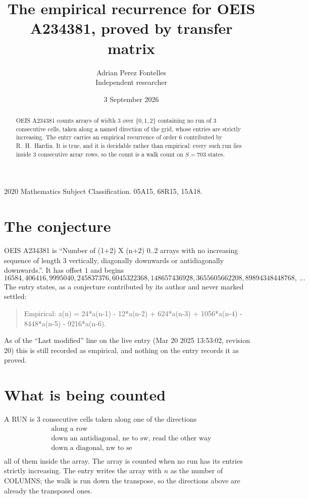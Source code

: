 \documentclass[11pt,a4paper]{article}
\title{The empirical recurrence for OEIS A234381, proved by transfer matrix}
\author{Adrian Perez Fontelles\\ \small Independent researcher}
\date{3 September 2026}
\theoremstyle{plain}
\theoremstyle{definition}
\begin{document}
\maketitle

\begin{abstract}
OEIS A234381 counts arrays of width $3$ over $\{0,1,2\}$ containing no run of $3$ consecutive
cells, taken along a named direction of the grid, whose entries are strictly increasing. The entry carries
an empirical recurrence of order $6$ contributed by R.~H.~Hardin. It is true, and it is
decidable rather than empirical: every such run lies inside $3$ consecutive array rows, so
the count is a walk count on $S=703$ states.
\end{abstract}

\noindent\small 2020 Mathematics Subject Classification. 05A15, 68R15, 15A18.\normalsize

\section{The conjecture}

OEIS A234381 is ``Number of (1+2) X (n+2) 0..2 arrays with no increasing sequence of length 3 vertically, diagonally downwards or antidiagonally downwards.''. It has offset $1$ and begins
\[
16584, 406416, 9995040, 245837376, 6045322368, 148657436928, 3655605662208, 89894348448768,\ \dots
\]
The entry states, as a conjecture contributed by its author and never marked settled:
\begin{quote}
Empirical: a(n) = 24*a(n-1) - 12*a(n-2) + 624*a(n-3) + 1056*a(n-4) - 8448*a(n-5) - 9216*a(n-6).
\end{quote}
As of the ``Last modified'' line on the live entry (Mar 20 2025 13:53:02, revision 20) this is still
recorded as empirical, and nothing on the entry records it as proved.

\section{What is being counted}

A RUN is $3$ consecutive cells taken along one of the directions
\[
\begin{array}{l}
\text{along a row} \\
\text{down an antidiagonal, ne to sw, read the other way} \\
\text{down a diagonal, nw to se} \\
\end{array}
\]
all of them inside the array. The array is counted when no run has its entries strictly increasing. The entry writes the array with $n$ as the number of COLUMNS; the walk is run down the transpose, so the directions above are already the transposed ones.
\end{document}
